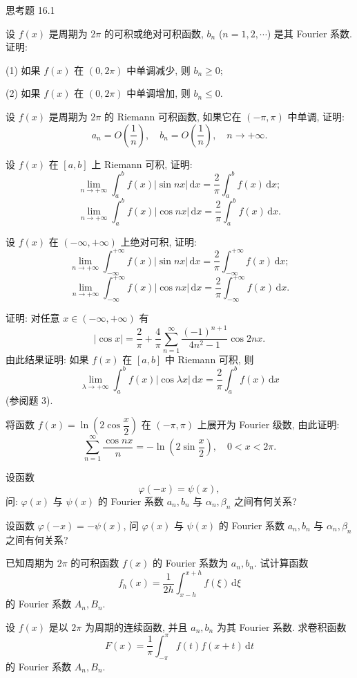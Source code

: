 \begin{exblock}{思考题 16.1}
\item 设 $f(x)$ 是周期为 $2\pi$ 的可积或绝对可积函数, $b_{n}$ ($n=1,2,\cdots$) 是其 Fourier 系数. 证明:

(1) 如果 $f(x)$ 在 $(0,2\pi)$ 中单调减少, 则 $b_{n}\geqslant 0$;

(2) 如果 $f(x)$ 在 $(0,2\pi)$ 中单调增加, 则 $b_{n}\leqslant 0$.
\item 设 $f(x)$ 是周期为 $2\pi$ 的 Riemann 可积函数, 如果它在 $(-\pi,\pi)$ 中单调, 证明:
\[
  a_{n}=O\left(\frac{1}{n}\right),\quad b_{n}=O\left(\frac{1}{n}\right),\quad n\to+\infty.
\]
\item 设 $f(x)$ 在 $[a,b]$ 上 Riemann 可积, 证明:
\[
  \lim_{n\to+\infty}\int_{a}^{b}f(x)|\sin nx|\,\mathrm{d}x=\frac{2}{\pi}\int_{a}^{b}f(x)\,\mathrm{d}x;
\]
\[
  \lim_{n\to+\infty}\int_{a}^{b}f(x)|\cos nx|\,\mathrm{d}x=\frac{2}{\pi}\int_{a}^{b}f(x)\,\mathrm{d}x.
\]
\item 设 $f(x)$ 在 $(-\infty,+\infty)$ 上绝对可积, 证明:
\[
  \lim_{n\to+\infty}\int_{-\infty}^{+\infty}f(x)|\sin nx|\,\mathrm{d}x=\frac{2}{\pi}\int_{-\infty}^{+\infty}f(x)\,\mathrm{d}x;
\]
\[
  \lim_{n\to+\infty}\int_{-\infty}^{+\infty}f(x)|\cos nx|\,\mathrm{d}x=\frac{2}{\pi}\int_{-\infty}^{+\infty}f(x)\,\mathrm{d}x.%
\]
\item 证明: 对任意 $x\in(-\infty,+\infty)$ 有
\[
  |\cos x|=\frac{2}{\pi}+\frac{4}{\pi}\sum_{n=1}^{\infty}\frac{(-1)^{n+1}}{4n^{2}-1}\cos 2nx.
\]
由此结果证明: 如果 $f(x)$ 在 $[a,b]$ 中 Riemann 可积, 则
\[
  \lim_{\lambda\to+\infty}\int_{a}^{b}f(x)|\cos\lambda x|\,\mathrm{d}x=\frac{2}{\pi}\int_{a}^{b}f(x)\,\mathrm{d}x
\]
(参阅题 3).
\item 将函数 $f(x)=\ln\left(2\cos\dfrac{x}{2}\right)$ 在 $(-\pi,\pi)$ 上展开为 Fourier 级数, 由此证明:
\[
  \sum_{n=1}^{\infty}\frac{\cos nx}{n}=-\ln\left(2\sin\frac{x}{2}\right),\quad 0<x<2\pi.
\]
\item 设函数
\[
  \varphi(-x)=\psi(x),
\]
问: $\varphi(x)$ 与 $\psi(x)$ 的 Fourier 系数 $a_{n}, b_{n}$ 与 $\alpha_{n}, \beta_{n}$ 之间有何关系?
\item 设函数 $\varphi(-x)=-\psi(x)$, 问 $\varphi(x)$ 与 $\psi(x)$ 的 Fourier 系数 $a_{n}, b_{n}$ 与 $\alpha_{n}, \beta_{n}$ 之间有何关系?
\item 已知周期为 $2\pi$ 的可积函数 $f(x)$ 的 Fourier 系数为 $a_{n}, b_{n}$. 试计算函数
\[
  f_{h}(x)=\frac{1}{2h}\int_{x-h}^{x+h}f(\xi)\,\mathrm{d}\xi
\]
的 Fourier 系数 $A_{n}, B_{n}$.
\item 设 $f(x)$ 是以 $2\pi$ 为周期的连续函数, 并且 $a_{n}, b_{n}$ 为其 Fourier 系数. 求卷积函数
\[
  F(x)=\frac{1}{\pi}\int_{-\pi}^{\pi}f(t)f(x+t)\,\mathrm{d}t
\]
的 Fourier 系数 $A_{n}, B_{n}$.
\end{exblock}
